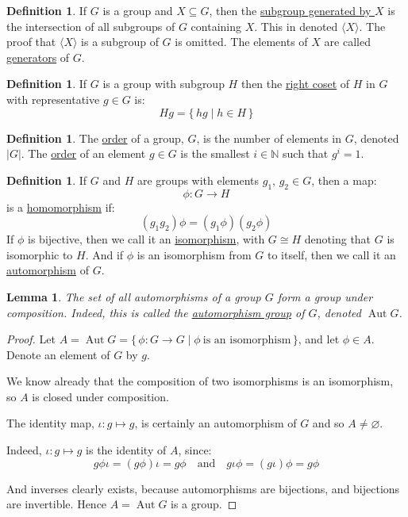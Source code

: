 \documentclass[a4paper, oneside, 12pt, final]{article}
\renewcommand{\emph}{\underline}
\newtheorem{lemma}[theorem]{Lemma}
\theoremstyle{definition}
\newtheorem{definition}[theorem]{Definition}
\DeclareMathOperator{\Aut}{Aut}
\newcommand{\N}{\mathbb{N}}
\begin{document}
\begin{definition}
    If \(G\) is a group and \(X \subseteq G\), then the \emph{subgroup generated by \(X\)} is the intersection of all
    subgroups of \(G\) containing \(X\).
    This in denoted \(\langle X \rangle\).
    The proof that \(\langle X \rangle\) is a subgroup of \(G\) is omitted.
    The elements of \(X\) are called \emph{generators} of \(G\).
\end{definition}

\begin{definition}
    If \(G\) is a group with subgroup \(H\) then the \emph{right coset} of \(H\) in \(G\) with representative \(g \in
    G\) is:
    \[Hg = \{\,hg \mid h \in H\,\}\]
\end{definition}


\begin{definition}
    The \emph{order} of a group, \(G\), is the number of elements in \(G\), denoted \(|G|\).
    The \emph{order} of an element \(g \in G\) is the smallest \(i \in \N\) such that \(g^i = 1\).
\end{definition}

\begin{definition}
    If \(G\) and \(H\) are groups with elements \(g_1,\, g_2 \in G\), then a map:
    \[\phi:G \to H\]
    is a \emph{homomorphism} if:
    \[(g_1 g_2)\phi = (g_1\phi)(g_2\phi)\]
    If \(\phi\) is bijective, then we call it an \emph{isomorphism}, with \(G \cong H\) denoting that \(G\) is
    isomorphic to \(H\).
    And if \(\phi\) is an isomorphism from \(G\) to itself, then we call it an \emph{automorphism} of \(G\).
\end{definition}

\begin{lemma}
    The set of all automorphisms of a group \(G\) form a group under composition.
    Indeed, this is called the \emph{automorphism group} of \(G\), denoted \(\Aut{G}\).
\end{lemma}

\begin{proof}
    Let \(A = \Aut{G} = \{\,\phi:G \to G \mid \phi\ \text{is an isomorphism}\,\}\), and let \(\phi \in A\).
    Denote an element of \(G\) by \(g\).

    We know already that the composition of two isomorphisms is an isomorphism, so \(A\) is closed under composition.

    The identity map, \(\iota:g \mapsto g\), is certainly an automorphism of \(G\) and so \(A \neq \varnothing\).

    Indeed, \(\iota:g \mapsto g\) is the identity of \(A\), since:
    \[g\phi\iota = (g\phi)\iota = g\phi \quad \text{and} \quad g\iota\phi = (g\iota)\phi = g\phi\]

    And inverses clearly exists, because automorphisms are bijections, and bijections are invertible.
    Hence \(A = \Aut{G}\) is a group.
\end{proof}
\end{document}
